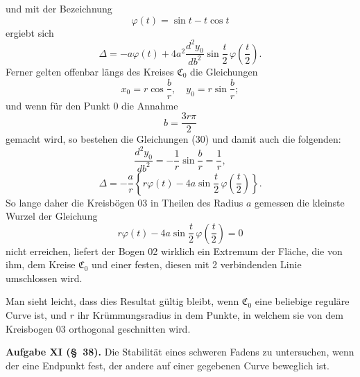 \documentclass[11pt,a4paper,leqno]{article}
\begin{document}
und mit der Bezeichnung
\[
\varphi(t)=\sin t-t\cos t
\]
ergiebt sich
\[
\Delta=-a\varphi(t)+4a^2\frac{d^2y_0}{db^2}\sin\frac{t}{2}\,\varphi\left(\frac{t}{2}\right).
\]
Ferner gelten offenbar längs des Kreises $\mathfrak{C}_0$ die Gleichungen
\[
x_0=r\cos\frac{b}{r},\quad y_0=r\sin\frac{b}{r};
\]
und wenn für den Punkt 0 die Annahme
\[
b=\frac{3r\pi}{2}
\]
gemacht wird, so bestehen die Gleichungen (30) und damit auch die folgenden:
\[
\frac{d^2y_0}{db^2}=-\frac{1}{r}\sin\frac{b}{r}=\frac{1}{r},
\]
\[
\Delta=-\frac{a}{r}\left\{r\varphi(t)-4a\sin\frac{t}{2}\,\varphi\left(\frac{t}{2}\right)\right\}.
\]
So lange daher die Kreisbögen 03 in Theilen des Radius $a$ gemessen die kleinste Wurzel der Gleichung
\[
r\varphi(t)-4a\sin\frac{t}{2}\,\varphi\left(\frac{t}{2}\right)=0
\]
nicht erreichen, liefert der Bogen 02 wirklich ein Extremum der Fläche, die von ihm, dem Kreise $\mathfrak{C}_0$ und einer festen, diesen mit 2 verbindenden Linie umschlossen wird.

Man sieht leicht, dass dies Resultat gültig bleibt, wenn $\mathfrak{C}_0$ eine beliebige reguläre Curve ist, und $r$ ihr Krümmungsradius in dem Punkte, in welchem sie von dem Kreisbogen 03 orthogonal geschnitten wird.

\noindent\textbf{Aufgabe XI (\S~38).} Die Stabilität eines schweren Fadens zu untersuchen, wenn der eine Endpunkt fest, der andere auf einer gegebenen Curve beweglich ist.
\end{document}
